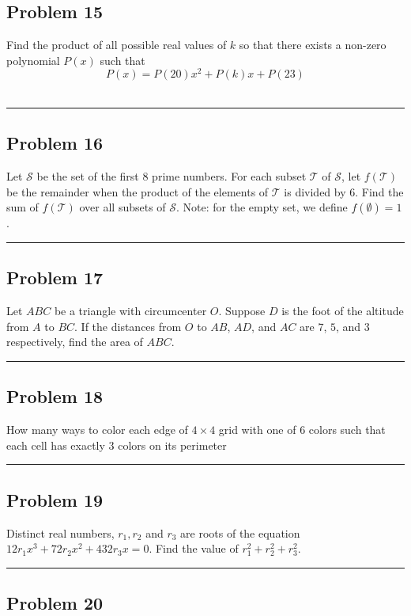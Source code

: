 \documentclass[10pt]{scrartcl}\usepackage[utf8]{inputenc}\usepackage{amsmath}\usepackage{amsfonts} \usepackage{tikz}\usepackage{asymptote}\usepackage[most]{tcolorbox}\usepackage{fancyhdr}\usepackage{geometry}\usepackage{color}\usepackage{lewis}\usepackage[T1]{fontenc}\usepackage[explicit]{titlesec}\usepackage{fontawesome}\usepackage{sansmathfonts}\pagestyle{fancy}
\begin{document}
\subsection*{Problem 15‎ ‎ ‎}

Find the product of all possible real values of $k$ so that there exists a non-zero polynomial $P(x)$ such that $$P(x)=P(20)x^2+P(k)x+P(23)$$
\\
\noindent\rule{14.5cm}{0.8pt}
\subsection*{Problem 16}
Let $\mathcal{S}$ be the set of the first 8 prime numbers. For each subset $\mathcal{T}$ of $\mathcal{S}$, let $f(\mathcal{T})$ be the remainder when the product of the elements of $\mathcal{T}$ is divided by $6$. Find the sum of $f(\mathcal{T})$ over all subsets of $\mathcal{S}$. Note: for the empty set, we define $f(\emptyset) = 1$.
\\
\noindent\rule{14.5cm}{0.8pt}

\subsection*{Problem 17}
Let $ABC$ be a triangle with circumcenter $O$. Suppose $D$ is the foot of the altitude from $A$ to $BC$. If the distances from $O$ to $AB$, $AD$, and $AC$ are $7$, $5$, and $3$ respectively, find the area of $ABC$.
\\
\noindent\rule{14.5cm}{0.8pt}
\subsection*{Problem 18}
How many ways to color each edge of $4\times 4$ grid with one of $6$ colors such that each cell has exactly $3$ colors on its perimeter
\\
\noindent\rule{14.5cm}{0.8pt}
\subsection*{Problem 19}

Distinct real numbers, $r_{1}, r_{2}$ and $r_{3}$ are roots of the equation $12 r_{1} x^{3}+72 r_{2} x^{2}+432 r_{3} x=0$. Find the value of $r_{1}^{2}+r_{2}^{2}+r_{3}^{2}.$
\\
\noindent\rule{14.5cm}{0.8pt}
\subsection*{Problem 20}
\end{document}
